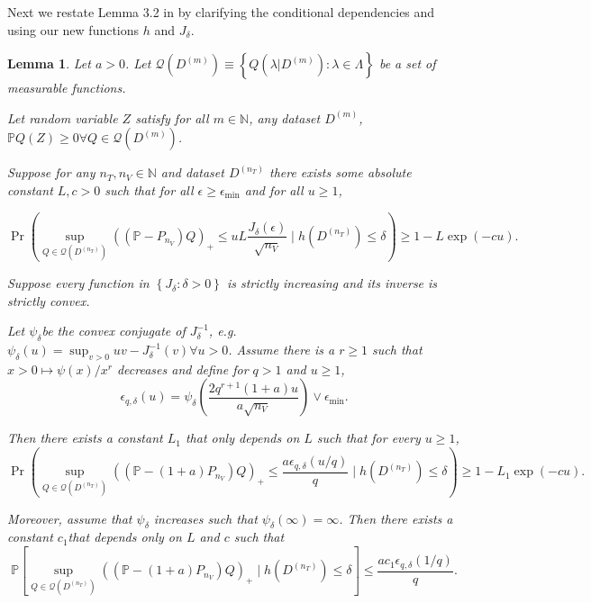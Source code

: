 \documentclass[10pt]{book}
\newtheorem{lemma}{Lemma}
\theoremstyle{definition}
\begin{document}
Next we restate Lemma 3.2 in \citet{lecue2012oracle} by clarifying the conditional dependencies and using our new functions $h$ and $J_\delta$.
\begin{lemma}
	Let $a>0$. Let $\mathcal{Q}(D^{(m)})\equiv\left\{ Q(\lambda|D^{(m)}):\lambda\in\Lambda\right\} $
	be a set of measurable functions.
	
	Let random variable $Z$ satisfy for all $m\in\mathbb{N}$, any dataset
	$D^{(m)}$, $\mathbb{P}Q(Z)\ge0\forall Q\in\mathcal{Q}\left(D^{(m)}\right)$.
	
	Suppose for any $n_{T},n_{V}\in\mathbb{N}$ and dataset $D^{(n_{T})}$
	there exists some absolute constant $L,c>0$ such that for all $\epsilon\ge\epsilon_{\min}$
	and for all $u\ge1$,
	
	\[
	\Pr\left(\sup_{Q\in\mathcal{Q}(D^{(n_{T})})}\left(\left(\mathbb{P}-P_{n_{V}}\right)Q\right)_{+}\le uL\frac{J_{\delta}(\epsilon)}{\sqrt{n_{V}}}\mid h\left(D^{(n_{T})}\right)\le\delta\right)\ge1-L\exp(-cu).
	\]
	
	
	Suppose every function in $\left\{ J_{\delta}:\delta>0\right\} $
	is strictly increasing and its inverse is strictly convex.
	
	Let $\psi_{\delta}$be the convex conjugate of $J_{\delta}^{-1}$,
	e.g. $\psi_{\delta}(u)=\sup_{v>0}uv-J_{\delta}^{-1}(v)\forall u>0$.
	Assume there is a $r\ge1$ such that $x>0\mapsto\psi(x)/x^{r}$ decreases
	and define for $q>1$ and $u\ge1$,
	\[
	\epsilon_{q,\delta}(u)=\psi_{\delta}\left(\frac{2q^{r+1}(1+a)u}{a\sqrt{n_{V}}}\right)\vee\epsilon_{\min}.
	\]
	
	
	Then there exists a constant $L_{1}$ that only depends on $L$ such
	that for every $u\ge1$,
	\[
	\Pr\left(\sup_{Q\in\mathcal{Q}(D^{(n_{T})})}\left(\left(\mathbb{P}-(1+a)P_{n_{V}}\right)Q\right)_{+}\le\frac{a\epsilon_{q,\delta}(u/q)}{q}\mid h\left(D^{(n_{T})}\right)\le\delta\right)\ge1-L_{1}\exp(-cu).
	\]
	
	
	Moreover, assume that $\psi_{\delta}$ increases such that $\psi_{\delta}(\infty)=\infty$.
	Then there exists a constant $c_{1}$that depends only on $L$ and
	$c$ such that
	\[
	\mathbb{P}\left[\sup_{Q\in\mathcal{Q}(D^{(n_{T})})}\left(\left(\mathbb{P}-(1+a)P_{n_{V}}\right)Q\right)_{+}\mid h\left(D^{(n_{T})}\right)\le\delta\right]\le\frac{ac_{1}\epsilon_{q,\delta}(1/q)}{q}.
	\]
\end{lemma}
\end{document}
